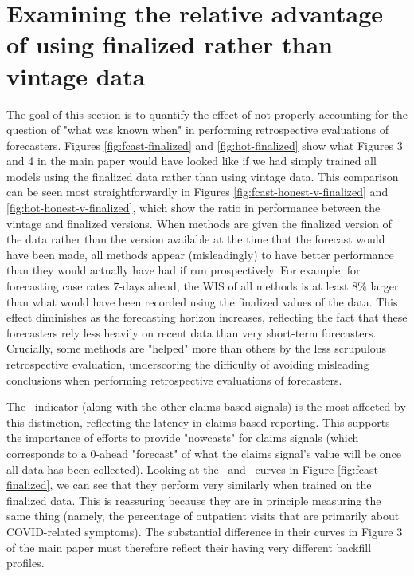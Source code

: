 

\section{Examining the relative advantage of using finalized rather than vintage data}

The goal of this section is to quantify the effect of
not properly accounting for the question of "what was known when" in
performing retrospective evaluations of forecasters.   Figures
\ref{fig:fcast-finalized} and \ref{fig:hot-finalized} show 
what Figures 3 and 4 in the main paper would have looked like if we
had simply trained all models using the finalized data rather than
using vintage data.  This comparison can be seen most
straightforwardly in Figures \ref{fig:fcast-honest-v-finalized} and
\ref{fig:hot-honest-v-finalized}, which show the ratio in performance between
the vintage and finalized 
versions.  When methods are 
given the finalized version of the data rather than the version available at the
time that the forecast would have been made, all methods 
appear (misleadingly) to have better performance than they would
actually have had if run prospectively.  For example, for forecasting case rates
7-days ahead, the WIS of all methods is at least 8\% larger than what would have been
recorded using the finalized values of the data.  This effect
diminishes as the forecasting horizon increases, reflecting the fact
that these forecasters rely less heavily on recent data than very
short-term forecasters.  Crucially, some methods are
"helped" more than others by the less scrupulous retrospective
evaluation, underscoring the difficulty of avoiding misleading
conclusions when performing retrospective evaluations of forecasters.

The \chngcli~indicator (along with the other claims-based signals) is the most
affected by this distinction, reflecting the latency in claims-based
reporting.  This supports the importance of efforts to provide "nowcasts" for claims signals
(which corresponds to a 0-ahead "forecast" of what the claims
signal's value will be once all data has been collected). Looking at
the \chngcli~and \dv~curves in Figure \ref{fig:fcast-finalized}, we
can see that they perform very similarly when trained on the finalized data.  This is reassuring
because they are in principle measuring the same thing (namely, the percentage of
  outpatient visits that are primarily about COVID-related symptoms).
  The substantial difference in their curves in Figure 3 of the
  main paper must therefore reflect their having very different
  backfill profiles.  
  

